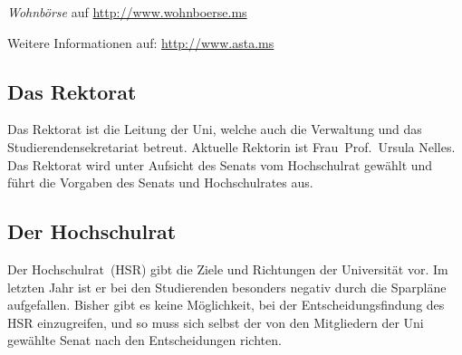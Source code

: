 \begin{multicols*}{2}
\begin{center}
{\begin{minipage}{0.95\columnwidth}
\textit{Wohnbörse} auf \url{http://www.wohnboerse.ms}

Weitere Informationen auf: \url{http://www.asta.ms}
\end{minipage}
}
\end{center}
\vspace{-1em}
\subsection*{Das Rektorat}
Das Rektorat ist die Leitung der Uni, welche auch die Verwaltung und das Studierendensekretariat betreut. Aktuelle Rektorin ist Frau~Prof.~Ursula Nelles. Das Rektorat wird unter Aufsicht des Senats vom Hochschulrat gewählt und führt die Vorgaben des Senats und Hochschulrates aus.
\vspace{-1em}
\subsection*{Der Hochschulrat}
Der Hochschulrat~(HSR) gibt die Ziele und Richtungen der Universität vor. Im letzten Jahr ist er bei den Studierenden besonders negativ durch die Sparpläne aufgefallen. Bisher gibt es keine Möglichkeit, bei der Entscheidungsfindung des HSR einzugreifen, und so muss sich selbst der von den Mitgliedern der Uni gewählte Senat nach den Entscheidungen richten.

\end{multicols*}

